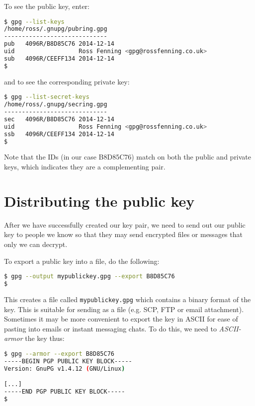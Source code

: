 \documentclass{report}
\begin{document}
To see the public key, enter:

\begin{lstlisting}[language=bash]
$ gpg --list-keys
/home/ross/.gnupg/pubring.gpg
-----------------------------
pub   4096R/B8D85C76 2014-12-14
uid                  Ross Fenning <gpg@rossfenning.co.uk>
sub   4096R/CEEFF134 2014-12-14
$
\end{lstlisting}

\noindent and to see the corresponding private key:

\begin{lstlisting}[language=bash]
$ gpg --list-secret-keys
/home/ross/.gnupg/secring.gpg
-----------------------------
sec   4096R/B8D85C76 2014-12-14
uid                  Ross Fenning <gpg@rossfenning.co.uk>
ssb   4096R/CEEFF134 2014-12-14
$
\end{lstlisting}

Note that the IDs (in our case B8D85C76) match on both the public
and private keys, which indicates they are a complementing pair.

\section{Distributing the public key}

After we have successfully created our key pair, we need to send
out our public key to people we know so that they may send
encrypted files or messages that only we can decrypt.

To export a public key into a file, do the following:

\begin{lstlisting}[language=bash]
$ gpg --output mypublickey.gpg --export B8D85C76
$
\end{lstlisting}

This creates a file called \texttt{mypublickey.gpg} which contains
a binary format of the key. This is suitable for sending as a file
(e.g. SCP, FTP or email attachment). Sometimes it may be more
convenient to export the key in ASCII for ease of pasting into emails
or instant messaging chats. To do this, we need to \emph{ASCII-armor}
the key thus:

\begin{lstlisting}[language=bash]
$ gpg --armor --export B8D85C76
-----BEGIN PGP PUBLIC KEY BLOCK-----
Version: GnuPG v1.4.12 (GNU/Linux)

[...]
-----END PGP PUBLIC KEY BLOCK-----
$
\end{lstlisting}
\end{document}
